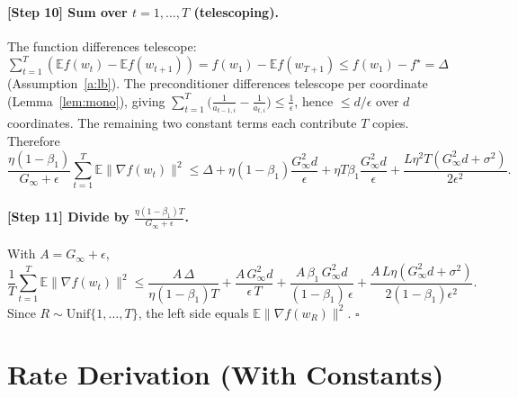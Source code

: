 \documentclass[11pt]{article}
\begin{document}
\paragraph{[Step 10] Sum over $t=1,\dots,T$ (telescoping).}
The function differences telescope:
$\sum_{t=1}^T(\mathbb{E}f(w_t)-\mathbb{E}f(w_{t+1}))
= f(w_1)-\mathbb{E}f(w_{T+1}) \le f(w_1)-f^\star=\Delta$
(Assumption~\ref{a:lb}). The preconditioner differences telescope per
coordinate (Lemma~\ref{lem:mono}), giving
$\sum_{t=1}^T\big(\frac{1}{a_{t-1,i}}-\frac{1}{a_{t,i}}\big)\le \frac1\epsilon$,
hence $\le d/\epsilon$ over $d$ coordinates. The remaining two constant terms
each contribute $T$ copies. Therefore
\[
\frac{\eta(1-\beta_1)}{G_\infty+\epsilon}\sum_{t=1}^T\mathbb{E}\|\nabla f(w_t)\|^2
\le \Delta
+ \eta(1-\beta_1)\frac{G_\infty^2 d}{\epsilon}
+ \eta T\beta_1\frac{G_\infty^2 d}{\epsilon}
+ \frac{L\eta^2 T(G_\infty^2 d+\sigma^2)}{2\epsilon^2}.
\]

\paragraph{[Step 11] Divide by $\frac{\eta(1-\beta_1)T}{G_\infty+\epsilon}$.}
With $A=G_\infty+\epsilon$,
\[
\frac1T\sum_{t=1}^T\mathbb{E}\|\nabla f(w_t)\|^2
\le \frac{A\,\Delta}{\eta(1-\beta_1) T}
+ \frac{A\,G_\infty^2 d}{\epsilon\,T}
+ \frac{A\,\beta_1\,G_\infty^2 d}{(1-\beta_1)\,\epsilon}
+ \frac{A\,L\eta(G_\infty^2 d+\sigma^2)}{2(1-\beta_1)\epsilon^2}.
\]
Since $R\sim\mathrm{Unif}\{1,\dots,T\}$, the left side equals
$\mathbb{E}\|\nabla f(w_R)\|^2$. \hfill$\square$

\section*{Rate Derivation (With Constants)}
\end{document}
